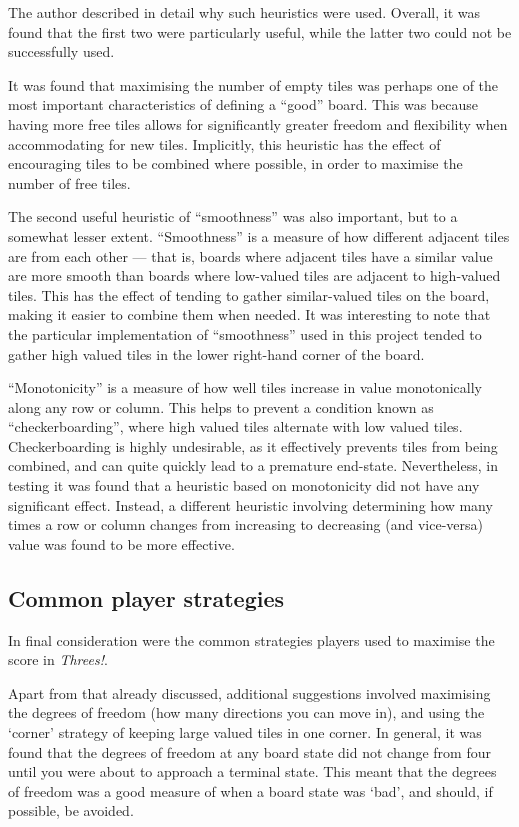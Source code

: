 \documentclass[a4paper, 11pt, titlepage]{report}
\newcommand{\threes}{\emph{Threes!}}
\begin{document}
The author described in detail why such heuristics were used\cite{2048explanation}. Overall, it was found that the first two were particularly useful, while the latter two could not be successfully used. 

It was found that maximising the number of empty tiles was perhaps one of the most important characteristics of defining a ``good'' board. This was because having more free tiles allows for significantly greater freedom and flexibility when accommodating for new tiles. Implicitly, this heuristic has the effect of encouraging tiles to be combined where possible, in order to maximise the number of free tiles.

The second useful heuristic of ``smoothness'' was also important, but to a somewhat lesser extent. ``Smoothness'' is a measure of how different adjacent tiles are from each other ---  that is, boards where adjacent tiles have a similar value are more smooth than boards where low-valued tiles are adjacent to high-valued tiles. This has the effect of tending to gather similar-valued tiles on the board, making it easier to combine them when needed. It was interesting to note that the particular implementation of ``smoothness'' used in this project tended to gather high valued tiles in the lower right-hand corner of the board.

``Monotonicity'' is a measure of how well tiles increase in value monotonically along any row or column. This helps to prevent a condition known as ``checkerboarding'', where high valued tiles alternate with low valued tiles. Checkerboarding is highly undesirable, as it effectively prevents tiles from being combined, and can quite quickly lead to a premature end-state. Nevertheless, in testing it was found that a heuristic based on monotonicity did not have any significant effect. Instead, a different heuristic involving determining how many times a row or column changes from increasing to decreasing (and vice-versa) value was found to be more effective.

\subsection{Common player strategies}
In final consideration were the common strategies\cite{threes-strategies} players used to maximise the score in \threes{}.

Apart from that already discussed, additional suggestions involved maximising the degrees of freedom (how many directions you can move in), and using the `corner' strategy of keeping large valued tiles in one corner. In general, it was found that the degrees of freedom at any board state did not change from four until you were about to approach a terminal state. This meant that the degrees of freedom was a good measure of when a board state was `bad', and should, if possible, be avoided. 
\end{document}
